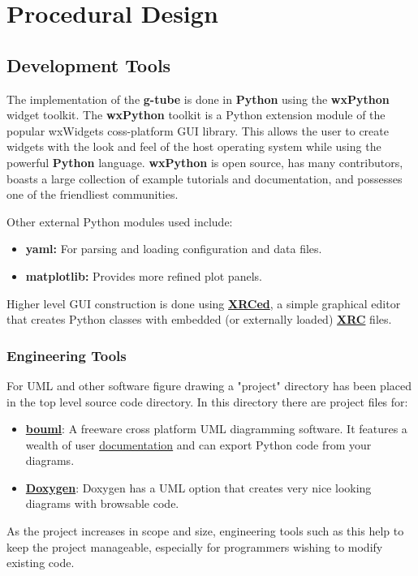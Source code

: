 \documentclass[12pt]{article}
\begin{document}
\section*{Procedural Design}

\subsection*{Development Tools}

	The implementation of the {\bf g-tube} is done in {\bf Python} using the {\bf wxPython} widget toolkit. The {\bf wxPython} toolkit is a Python extension module of the popular {wxWidgets} coss-platform GUI library. This allows the user to create widgets with the look and feel of the host operating system while using the powerful {\bf Python} language. {\bf wxPython} is open source, has many contributors, boasts a large collection of example tutorials and documentation, and possesses one of the friendliest communities.
	
Other external Python modules used include:

\begin{itemize}	
\item[] {\bf yaml:} For parsing and loading configuration and data files.
\item[] {\bf matplotlib:} Provides more refined plot panels.
\end{itemize}

Higher level GUI construction is done using \href{http://xrced.sourceforge.net/}{\bf XRCed}, a simple graphical editor that creates Python classes with embedded (or externally loaded) \href{http://wiki.wxpython.org/XRCTutorial}{\bf XRC} files. 

\subsubsection*{Engineering Tools}

For UML and other software figure drawing a "project" directory has been placed in the top level source code directory. In this directory there are project files for:

\begin{itemize}
\item[] \href{http://bouml.free.fr}{\bf bouml}: A freeware cross platform UML diagramming software. It features a wealth of user \href{http://bouml.free.fr/doc/index.html}{documentation} and can export Python code from your diagrams.
\item[] \href{http://www.stack.nl/~dimitri/doxygen/}{\bf Doxygen}: Doxygen has a UML option that creates very nice looking diagrams with browsable code.
\end{itemize}

As the project increases in scope and size, engineering tools such as this help to keep the project manageable, especially for programmers wishing to modify existing code.
\end{document}
